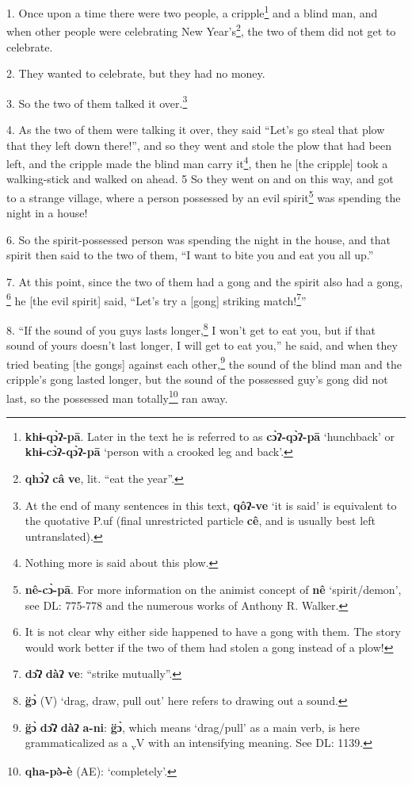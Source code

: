 \setcounter{footnote}{0}

1. Once upon a time there were two people, a cripple\footnote{\textbf{khɨ-qɔ̀ʔ-pā}. Later in the text he is referred to as \textbf{cɔ̀ʔ-qɔ̀ʔ-pā} `hunchback' or \textbf{khɨ-cɔ̀ʔ-qɔ̀ʔ-pā} `person with a crooked leg and back'.} and a blind man, and when
other people were celebrating New Year's\footnote{\textbf{qhɔ̀ʔ} \textbf{câ} \textbf{ve}, lit. ``eat the year''.}, the two of them did not get to celebrate.

2. They wanted to celebrate, but they had no money.

3. So the two of them talked it over.\footnote{At the end of many sentences in this text, \textbf{qôʔ-ve} `it is said' is equivalent to the quotative P.uf (final unrestricted particle \textbf{cê}, and is usually best left untranslated).}

4. As the two of them were talking it over, they said ``Let's go steal that plow
that they left down there!'', and so they went and stole the plow that had been
left, and the cripple made the blind man carry it\footnote{Nothing more is said about this plow.}, then he [the cripple] took
a walking-stick and walked on ahead. 5 So they went on and on this way, and got
to a strange village, where a person possessed by an evil spirit\footnote{\textbf{nê-cɔ̀-pā}. For more information on the animist concept of \textbf{nê} `spirit/demon', see DL: 775-778 and the numerous works of Anthony R. Walker.} was spending
the night in a house!

6. So the spirit-possessed person was spending the night in the house, and that
spirit then said to the two of them, ``I want to bite you and eat you all up.''

7. At this point, since the two of them had a gong and the spirit also had a gong,
\footnote{It is not clear why either side happened to have a gong with them. The story would work better if the two of them had stolen a gong instead of a plow!} he [the evil spirit] said, ``Let's try a [gong] striking match!\footnote{\textbf{dɔ̂ʔ} \textbf{dàʔ} \textbf{ve}: ``strike mutually''.}''

8. ``If the sound of you guys lasts longer,\footnote{\textbf{g̈ɔ̀} (V) `drag, draw, pull out' here refers to drawing out a sound.} I won't get to eat you,
but if that sound of yours doesn't last longer, I will get to eat you,'' he said,
and when they tried beating [the gongs] against each other,\footnote{\textbf{g̈ɔ̀} \textbf{dɔ̂ʔ} \textbf{dàʔ} \textbf{a-ni}: \textbf{g̈ɔ̀}, which means `drag/pull' as a main verb, is here grammaticalized as a \textsubscript{v}V with an intensifying meaning. See DL: 1139.} the sound of the
blind man and the cripple's gong lasted longer, but the sound of the possessed
guy's gong did not last, so the possessed man totally\footnote{\textbf{qha-pə̀-è} (AE): `completely'.} ran away.

